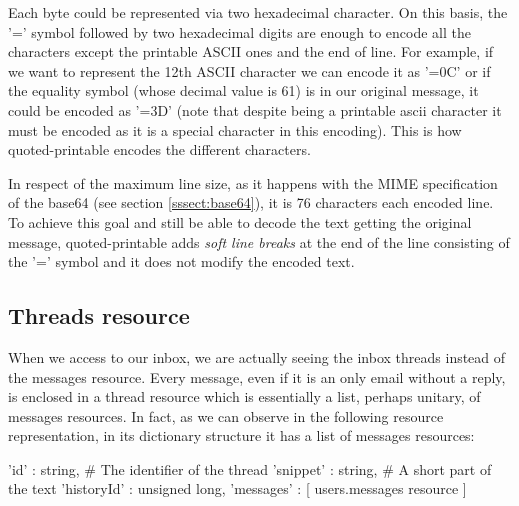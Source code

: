 Each byte could be represented via two hexadecimal character. On this basis, the '=' symbol followed by two hexadecimal digits are enough to encode all the characters except the printable ASCII ones and the end of line. For example, if we want to represent the 12th ASCII character we can encode it as '=0C' or if the equality symbol (whose decimal value is 61) is in our original message, it could be encoded as '=3D' (note that despite being a printable ascii character it must be encoded as it is a special character in this encoding). This is how quoted-printable encodes the different characters.

In respect of the maximum line size, as it happens with the MIME specification of the base64 (see section \ref{sssect:base64}), it is 76 characters each encoded line. To achieve this goal and still be able to decode the text getting the original message, quoted-printable adds \textit{soft line breaks} at the end of the line consisting of the '=' symbol and it does not modify the encoded text.

\subsection{Threads resource}\label{ssect:threads}
When we access to our inbox, we are actually seeing the inbox threads instead of the messages resource. Every message, even if it is an only email without a reply, is enclosed in a thread resource \citep[/v1/reference/users/threads]{gmailAPI} which is essentially a list, perhaps unitary, of messages resources. In fact, as we can observe in the following resource representation, in its dictionary structure it has a list of messages resources:

\begin{python}
	{
		'id' : string, # The identifier of the thread
		'snippet' : string, # A short part of the text
		'historyId' : unsigned long,
		'messages' : [ users.messages resource ]
	}
\end{python}

